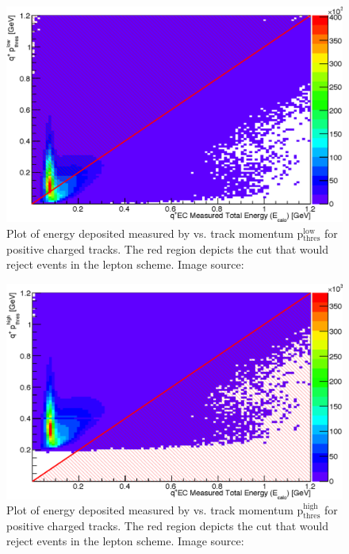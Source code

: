 \begin{figure}\begin{center}
\includegraphics[width=0.45\columnwidth]{figures/lepton/Pip_EClow.eps}
\caption[ Deposited Energy Comparison to Lower Threshold Track Momentum for q$^+$ Tracks]{\label{fig:islep.pipEClow}Plot of energy deposited measured by  vs. track momentum p$\mathrm{_{thres}^{low}}$ for positive charged tracks. The red region depicts the cut that would reject events in the  lepton   scheme. Image source:~\cite{clas.thesis.kunkel}}
\end{center}\end{figure}

\begin{figure}\begin{center}
\includegraphics[width=0.45\columnwidth]{figures/lepton/Pip_EChigh.eps}
\caption[ Deposited Energy Comparison to Upper Threshold Track Momentum for q$^+$ Tracks]{\label{fig:islep.pipEChigh}Plot of energy deposited measured by  vs. track momentum p$\mathrm{_{thres}^{high}}$ for positive charged tracks. The red region depicts the cut that would reject events in the  lepton   scheme. Image source:~\cite{clas.thesis.kunkel}}
\end{center}\end{figure}


